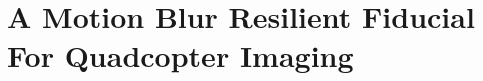 \chapter[Blur Resilient Fiducials]{A Motion Blur Resilient Fiducial For
Quadcopter Imaging}
\label{ch:fiducial}